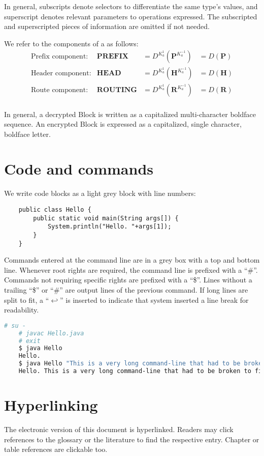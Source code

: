 In general, subscripts denote selectors to differentiate the same type's values, and superscript denotes relevant parameters to operations expressed. The subscripted and superscripted pieces of information are omitted if not needed.

We refer to the components of a \VortexMessage as follows:
\begin{align*}
	\text{Prefix component:}         & \mathbf{PREFIX}                 &=D^{K^{1}_a}\left(\mathbf{P}^{K^{-1}_a}\right) &=D\left(\mathbf{P}\right)\\
	\text{Header component:}         & \mathbf{HEAD}                   &=D^{K^{1}_a}\left(\mathbf{H}^{K^{-1}_a}\right) &=D\left(\mathbf{H}\right)\\
	\text{Route component:}         & \mathbf{ROUTING}                 &=D^{K^{1}_a}\left(\mathbf{R}^{K^{-1}_a}\right) &=D\left(\mathbf{R}\right)\\
\end{align*}

In general, a decrypted Block is written as a capitalized multi-character boldface sequence. An encrypted Block is expressed as a capitalized, single character, boldface letter.

\section{Code and commands}
We write code blocks as a light grey block with line numbers:

\begin{lstlisting}
	public class Hello {
		public static void main(String args[]) {
			System.println("Hello. "+args[1]);
		}
	}
\end{lstlisting}

Commands entered at the command line are in a grey box with a top and bottom line. Whenever root rights are required, the command line is prefixed with a ``\#''. Commands not requiring specific rights are prefixed with a ``\$''. Lines without a trailing ``\$'' or ``\#'' are output lines of the previous command. If long lines are split to fit, a ``$\hookleftarrow$'' is inserted to indicate that system inserted a line break for readability.

\begin{lstlisting}[language=bash]
	# su -
	# javac Hello.java 
	# exit
	$ java Hello
	Hello.
	$ java Hello "This is a very long command-line that had to be broken to fit into the code box displayed on this page."
	Hello. This is a very long command-line that had to be broken to fit into the code box displayed on this page.
\end{lstlisting}

\section{Hyperlinking}
The electronic version of this document is hyperlinked. Readers may click references to the glossary or the literature to find the respective entry. Chapter or table references are clickable too. 


